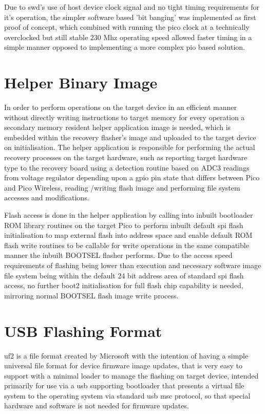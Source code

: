 {Due to \gls{swd}'s use of host device clock signal and no tight timing requirements for it's operation, the simpler software based 'bit banging' was implemented as first proof of concept, which combined with running the pico clock at a technically overclocked but still stable 230 Mhz operating speed allowed faster timing in a simple manner opposed to implementing a more complex pio based solution.


\clearpage
\section{Helper Binary Image}
In order to perform operations on the target device in an efficient manner without directly writing instructions to target memory for every operation a secondary memory resident helper application image is needed, which is embedded within the recovery flasher's image and uploaded to the target device on initialisation. The helper application is responsible for performing the actual recovery processes on the target hardware, such as reporting target hardware type to the recovery board using a detection routine based on ADC3 readings from voltage regulator depending upon a \gls{gpio} pin state that differs between Pico and Pico Wireless\cite{IdentifyingPicoPicoW}, reading /writing flash image and performing file system accesses and modifications.

Flash access is done in the helper application by calling into inbuilt bootloader ROM library routines on the target Pico to perform inbuilt default \gls{spi} flash initialisation to map external flash into address space and enable default ROM flash write routines to be callable for write operations in the same compatible manner the inbuilt BOOTSEL flasher performs. Due to the access speed requirements of flashing being lower than execution and necessary software image file system being within the default 24 bit address area of standard \gls{spi} flash access, no further boot2 initialisation for full flash chip capability is needed, mirroring normal BOOTSEL flash image write process.

\clearpage
\section{USB Flashing Format}
\gls{uf2} is a file format created by Microsoft with the intention of having a simple universal file format for device firmware image updates, that is very easy to support with a minimal loader to manage the flashing on target device, intended primarily for use via a \gls{usb} supporting bootloader that presents a virtual file system to the operating system via standard \gls{usb} \gls{msc} protocol, so that special hardware and software is not needed for firmware updates.

}

